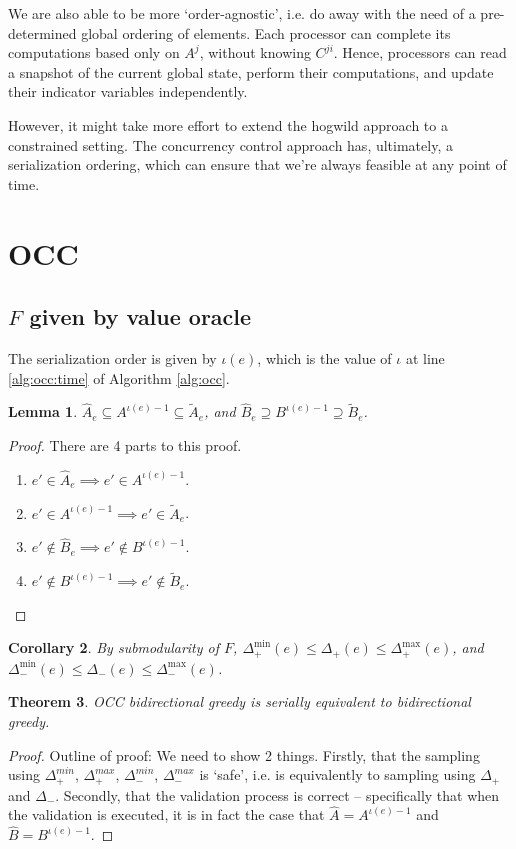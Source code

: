 \documentclass{article} %
\newtheorem{thm}{Theorem}[section]
\newtheorem{cor}[thm]{Corollary}
\newtheorem{lem}[thm]{Lemma}
\begin{document}
We are also able to be more `order-agnostic', i.e. do away with the need of a pre-determined global ordering of elements.
Each processor can complete its computations based only on $A^j$, without knowing $C^{ji}$.
Hence, processors can read a snapshot of the current global state, perform their computations, and update their indicator variables independently.

However, it might take more effort to extend the hogwild approach to a constrained setting.
The concurrency control approach has, ultimately, a serialization ordering, which can ensure that we're always feasible at any point of time.



\newpage
\section{OCC}

\subsection{$F$ given by value oracle}

The serialization order is given by $\iota(e)$, which is the value of $\iota$ at line \ref{alg:occ:time} of Algorithm \ref{alg:occ}.

\begin{lem} $\hat{A}_e \subseteq A^{\iota(e)-1} \subseteq \tilde{A}_e$, and $\hat{B}_e \supseteq B^{\iota(e)-1} \supseteq \tilde{B}_e$.
\end{lem}
\begin{proof}
There are 4 parts to this proof.
\begin{enumerate}
\item $e' \in \hat{A}_e \implies e' \in A^{\iota(e)-1}$.
\item $e' \in A^{\iota(e)-1} \implies e' \in\tilde{A}_e$.
\item $e' \not\in \hat{B}_e \implies e' \not\in B^{\iota(e)-1}$.
\item $e' \not\in B^{\iota(e)-1} \implies e' \not\in\tilde{B}_e$.
\end{enumerate}
\end{proof}

\begin{cor} By submodularity of $F$, $\Delta_+^{\min}(e) \leq \Delta_+(e) \leq \Delta_+^{\max}(e)$, and $\Delta_-^{\min}(e) \leq \Delta_-(e) \leq \Delta_-^{\max}(e)$.
\end{cor}

\begin{thm} OCC bidirectional greedy is serially equivalent to bidirectional greedy.
\end{thm}
\begin{proof}
Outline of proof: We need to show 2 things.
Firstly, that the sampling using $\Delta_+^{min}$, $\Delta_+^{max}$, $\Delta_-^{min}$, $\Delta_-^{max}$ is `safe', i.e. is equivalently to sampling using $\Delta_+$ and $\Delta_-$.
Secondly, that the validation process is correct -- specifically that when the validation is executed, it is in fact the case that $\hat{A} = A^{\iota(e)-1}$ and $\hat{B} = B^{\iota(e)-1}$.
\end{proof}
\end{document}
